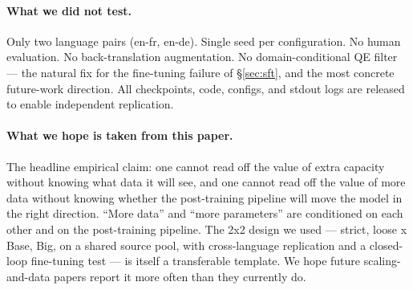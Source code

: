 \paragraph{What we did not test.}
Only two language pairs (en-fr, en-de). Single seed per configuration. No human evaluation. No back-translation augmentation. No domain-conditional QE filter --- the natural fix for the fine-tuning failure of \S\ref{sec:sft}, and the most concrete future-work direction. All checkpoints, code, configs, and stdout logs are released to enable independent replication.

\paragraph{What we hope is taken from this paper.}
The headline empirical claim: one cannot read off the value of extra capacity without knowing what data it will see, and one cannot read off the value of more data without knowing whether the post-training pipeline will move the model in the right direction. ``More data'' and ``more parameters'' are conditioned on each other and on the post-training pipeline. The 2x2 design we used --- {strict, loose} x {Base, Big}, on a shared source pool, with cross-language replication and a closed-loop fine-tuning test --- is itself a transferable template. We hope future scaling-and-data papers report it more often than they currently do.
